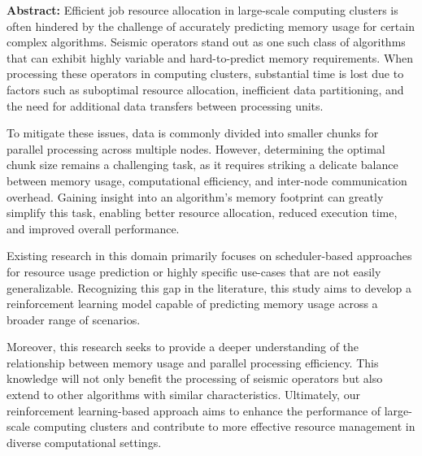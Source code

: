 \textbf{Abstract:} Efficient job resource allocation in large-scale computing clusters is often hindered by the challenge of accurately predicting memory usage for certain complex algorithms.
Seismic operators stand out as one such class of algorithms that can exhibit highly variable and hard-to-predict memory requirements.
When processing these operators in computing clusters, substantial time is lost due to factors such as suboptimal resource allocation, inefficient data partitioning, and the need for additional data transfers between processing units.

To mitigate these issues, data is commonly divided into smaller chunks for parallel processing across multiple nodes.
However, determining the optimal chunk size remains a challenging task, as it requires striking a delicate balance between memory usage, computational efficiency, and inter-node communication overhead.
Gaining insight into an algorithm's memory footprint can greatly simplify this task, enabling better resource allocation, reduced execution time, and improved overall performance.

Existing research in this domain primarily focuses on scheduler-based approaches for resource usage prediction or highly specific use-cases that are not easily generalizable.
Recognizing this gap in the literature, this study aims to develop a reinforcement learning model capable of predicting memory usage across a broader range of scenarios.

Moreover, this research seeks to provide a deeper understanding of the relationship between memory usage and parallel processing efficiency.
This knowledge will not only benefit the processing of seismic operators but also extend to other algorithms with similar characteristics.
Ultimately, our reinforcement learning-based approach aims to enhance the performance of large-scale computing clusters and contribute to more effective resource management in diverse computational settings.
